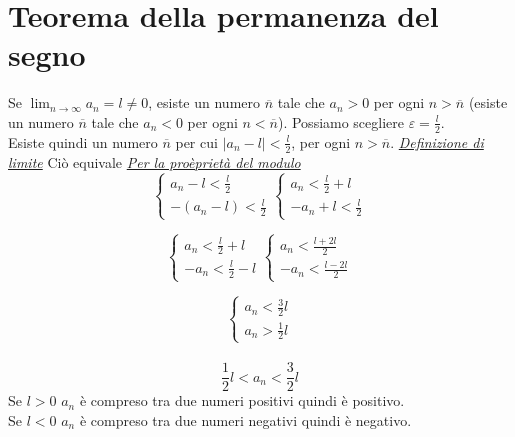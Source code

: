 \documentclass{article}
\begin{document}
\section{Teorema della permanenza del segno}
Se $\lim_{{n \to \infty}} a_n = l \neq 0$, esiste un numero $\overline{n}$ tale che $a_n>0$ per ogni $n>\overline{n}$ (esiste un numero $\overline{n}$ tale che $a_n<0$ per ogni $n<\overline{n}$).
Possiamo scegliere $\varepsilon=\frac{l}{2}$.\\
Esiste quindi un numero $\overline{n}$ per cui $|a_n-l| < \frac{l}{2}$, per ogni $n>\overline{n}$. \underline{\textit {Definizione di limite}} Ciò equivale \underline{\textit{Per la proèprietà del modulo}}
\begin{equation}
    \begin{cases}
        a_n - l < \frac{l}{2} \\
        -(a_n - l) < \frac{l}{2}
    \end{cases}
    \begin{cases}
        a_n < \frac{l}{2} + l \\
        -a_n + l < \frac{l}{2}
    \end{cases}
\end{equation}

\begin{equation}
    \begin{cases}
        a_n < \frac{l}{2} + l \\
        -a_n < \frac{l}{2} - l
    \end{cases}
    \begin{cases}
        a_n < \frac{l+2l}{2} \\
        -a_n < \frac{l-2l}{2}
    \end{cases}
\end{equation}

\begin{equation}
    \begin{cases}
        a_n < \frac{3}{2}l \\
        a_n > \frac{1}{2}l
    \end{cases}
\end{equation}
\\
$$\frac{1}{2}l < a_n < \frac{3}{2}l $$
Se $l>0$ $a_n$ è compreso tra due numeri positivi quindi è positivo.\\
Se $l<0$ $a_n$ è compreso tra due numeri negativi quindi è negativo.
\end{document}

